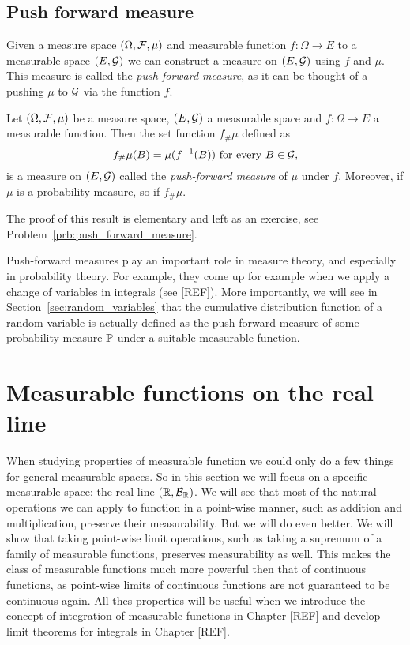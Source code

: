 \subsection{Push forward measure}

Given a measure space $(\Omega, \mathcal F, \mu)$ and measurable function $f : \Omega \to E$ to a measurable space $(E,\mathcal G)$ we can construct a measure on $(E,\mathcal G)$ using $f$ and $\mu$. This measure is called the \emph{push-forward measure}, as it can be thought of a pushing $\mu$ to $\mathcal G$ via the function $f$.

\begin{proposition}\label{prop:push_forward_measure}
Let $(\Omega, \mathcal F, \mu)$ be a measure space, $(E, \mathcal G)$ a measurable space and $f : \Omega \to E$ a measurable function. Then the set function $f_\# \mu$ defined as
\[
	f_\# \mu (B) = \mu(f^{-1}(B)) \text{ for every } B \in \mathcal G,
\]
is a measure on $(E, \mathcal G)$ called the \emph{push-forward measure} of $\mu$ under $f$. Moreover, if $\mu$ is a probability measure, so if $f_\# \mu$.
\end{proposition}

The proof of this result is elementary and left as an exercise, see Problem~\ref{prb:push_forward_measure}. 

Push-forward measures play an important role in measure theory, and especially in probability theory. For example, they come up for example when we apply a change of variables in integrals (see [REF]). More importantly, we will see in Section~\ref{sec:random_variables} that the cumulative distribution function of a random variable is actually defined as the push-forward measure of some probability measure $\mathbb P$ under a suitable measurable function.

\section{Measurable functions on the real line}\label{sec:measurable_functions_real_line}

When studying properties of measurable function we could only do a few things for general measurable spaces. So in this section we will focus on a specific measurable space: the real line $(\mathbb R, \mathcal B_{\mathbb R})$. We will see that most of the natural operations we can apply to function in a point-wise manner, such as addition and multiplication, preserve their measurability. But we will do even better. We will show that taking point-wise limit operations, such as taking a supremum of a family of measurable functions, preserves measurability as well. This makes the class of measurable functions much more powerful then that of continuous functions, as point-wise limits of continuous functions are not guaranteed to be continuous again. All thes properties will be useful when we introduce the concept of integration of measurable functions in Chapter [REF] and develop limit theorems for integrals in Chapter [REF].


